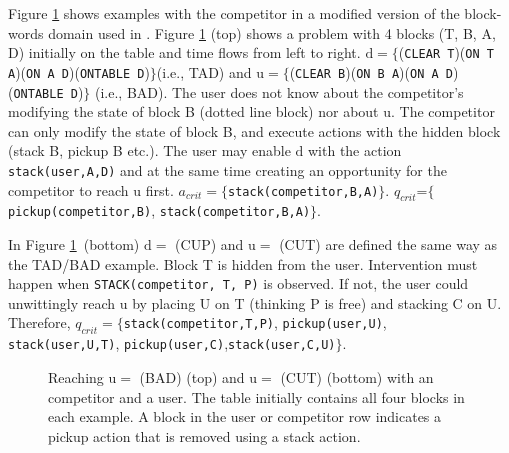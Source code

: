 \documentclass[doctor]{thesis} %
\theoremstyle{plain}
\begin{document}
Figure \ref{fig:multi} shows examples with the competitor in a modified version of the block-words domain used in \cite{ramirez2009plan}.
Figure \ref{fig:multi} (top) shows a problem with 4 blocks (T, B, A, D) initially on the table and time flows from left to right. 
$\mathrm{d}=\lbrace$(\texttt{CLEAR T})(\texttt{ON T A})(\texttt{ON A D})(\texttt{ONTABLE D})$\rbrace$(i.e., TAD) and $\mathrm{u}=\lbrace$(\texttt{CLEAR B})(\texttt{ON B A})(\texttt{ON A D})(\texttt{ONTABLE D})$\rbrace$ (i.e., BAD).
The user does not know about the competitor's modifying the state of block B (dotted line block) nor about $\mathrm{u}$. The competitor can only modify the state of block B, and execute actions with the hidden block (stack B, pickup B etc.).
The user may enable $\mathrm{d}$ with the action \texttt{stack(user,A,D)} and at the same time creating an opportunity for the competitor to reach $\mathrm{u}$ first. 
$a_{crit}=\lbrace$\texttt{stack(competitor,B,A)}$\rbrace$. 
$q_{crit}$=$\lbrace$\texttt{pickup(competitor,B)}, \texttt{stack(competitor,B,A)}$\rbrace$.

In Figure \ref{fig:multi}~(bottom) $\mathrm{d}= $ (CUP) and $\mathrm{u}= $ (CUT) are defined the same way as the TAD/BAD example. Block T is hidden from the user. Intervention must happen when \texttt{STACK(competitor, T, P)} is observed. If not, the user could unwittingly reach $\mathrm{u}$ by placing U on T (thinking P is free) and stacking C on U. 
Therefore, $q_{crit}=\lbrace$\texttt{stack(competitor,T,P)}, \texttt{pickup(user,U)},\\ \texttt{stack(user,U,T)}, \texttt{pickup(user,C)},\texttt{stack(user,C,U)}$\rbrace$.

\begin{figure}[t]
                  \vspace{-1em}
        \caption{Reaching $\mathrm{u}= $ (BAD) (top) and $\mathrm{u}= $ (CUT) (bottom) with an competitor and a user.  The table initially contains all four blocks in each example. A block in the user or competitor row indicates a pickup action that is removed using a stack action.}
        \vspace{-1em}
        \label{fig:multi}
\end{figure}
\end{document}
